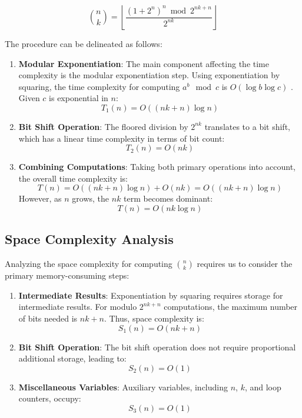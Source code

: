 \documentclass{article}
\theoremstyle{plain}
\theoremstyle{definition}
\begin{document}
\begin{equation*}
\binom{n}{k} = \left\lfloor\frac{(1 + 2^{n})^{n} \bmod 2^{n k + n}}{2^{n k}}\right\rfloor
\end{equation*}

The procedure can be delineated as follows:

\begin{enumerate}
\item \textbf{Modular Exponentiation}: The main component affecting the time complexity is the modular exponentiation step. Using exponentiation by squaring, the time complexity for computing \(a^b \mod c\) is \(O(\log{b} \log{c})\) \cite{koblitz1994course}. Given \(c\) is exponential in \(n\):
\[
T_1(n) = O((nk + n) \log{n})
\]

\item \textbf{Bit Shift Operation}: The floored division by \(2^{nk}\) translates to a bit shift, which has a linear time complexity in terms of bit count:
\[
T_2(n) = O(nk)
\]

\item \textbf{Combining Computations}: Taking both primary operations into account, the overall time complexity is:
\[
T(n) = O((nk + n) \log{n}) + O(nk) = O((nk + n) \log{n})
\]
However, as \(n\) grows, the \(nk\) term becomes dominant:
\[
T(n) = O(nk \log{n})
\]
\end{enumerate}

\subsection{Space Complexity Analysis}
Analyzing the space complexity for computing $\binom{n}{k}$ requires us to consider the primary memory-consuming steps:

\begin{enumerate}
\item \textbf{Intermediate Results}: Exponentiation by squaring requires storage for intermediate results. For modulo $2^{nk + n}$ computations, the maximum number of bits needed is $nk + n$. Thus, space complexity is:
\[
S_1(n) = O(nk + n)
\]

\item \textbf{Bit Shift Operation}: The bit shift operation does not require proportional additional storage, leading to:
\[
S_2(n) = O(1)
\]

\item \textbf{Miscellaneous Variables}: Auxiliary variables, including $n$, $k$, and loop counters, occupy:
\[
S_3(n) = O(1)
\]
\end{enumerate}
\end{document}
